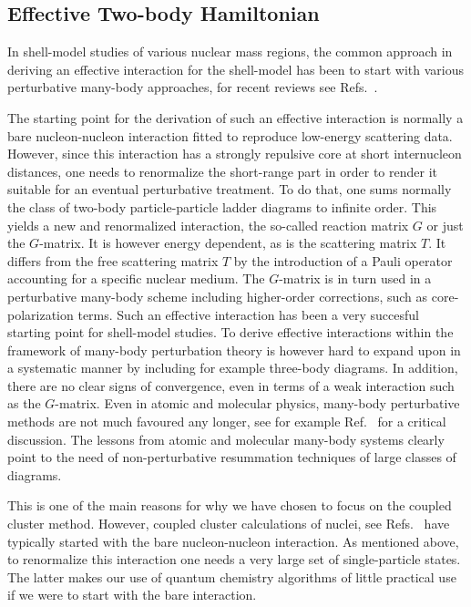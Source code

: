 \documentclass[fleqn,12pt,twoside]{article}
\begin{document}
\subsection{Effective Two-body Hamiltonian}

In shell-model studies of various nuclear mass regions, the common approach 
in deriving an effective interaction for the shell-model has been to start
with various perturbative many-body approaches, for recent reviews 
see Refs.~\cite{mhj95,dehko04}.

The starting point for the derivation of such an effective interaction is normally a
bare nucleon-nucleon interaction fitted to reproduce low-energy scattering data.
However, since this interaction has a strongly repulsive core at short internucleon 
distances, one needs to renormalize the short-range part in order to render
it suitable for an eventual perturbative treatment. To do that, one sums normally
the class of two-body particle-particle ladder diagrams to infinite order. 
This yields 
a new and renormalized interaction, the so-called reaction matrix $G$ or just 
the $G$-matrix. It is however energy dependent, as is the scattering matrix $T$.
It differs from the free scattering matrix $T$ by the introduction of a Pauli operator
accounting for a specific nuclear medium. 
The $G$-matrix is in turn used in a perturbative many-body scheme including higher-order
corrections, such as core-polarization terms. 
Such an effective interaction has 
been a very succesful starting point for shell-model studies. 
To derive effective interactions within
the framework of many-body perturbation theory
is however hard to expand upon in a systematic manner by including for example
three-body diagrams.
In addition, there are
no clear signs of convergence, even  in terms of a weak interaction 
such as the $G$-matrix. Even in atomic
 and molecular physics, many-body perturbative
methods are not much favoured any longer, see for example Ref.~\cite{helgaker} for a
critical discussion.
The lessons from atomic and molecular many-body systems clearly point to
the need of non-perturbative resummation techniques of large
classes of diagrams.

This is one of the main reasons for why we 
have chosen to focus on the coupled cluster method. 
However, coupled cluster calculations of nuclei, 
see Refs.~\cite{klz78,ticcm,hm99} have typically started
with the bare nucleon-nucleon interaction. As mentioned above, 
to renormalize this interaction one needs a 
very large set of single-particle 
states. The latter makes our use of quantum chemistry algorithms of 
little practical use if we were to start
with the bare interaction.
\end{document}
